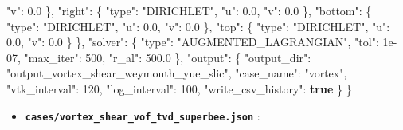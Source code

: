\documentclass[
  10pt,
]{article}
\newenvironment{Shaded}{}{}
\newcommand{\DataTypeTok}[1]{\textcolor[rgb]{0.56,0.13,0.00}{#1}}
\newcommand{\DecValTok}[1]{\textcolor[rgb]{0.25,0.63,0.44}{#1}}
\newcommand{\FloatTok}[1]{\textcolor[rgb]{0.25,0.63,0.44}{#1}}
\newcommand{\FunctionTok}[1]{\textcolor[rgb]{0.02,0.16,0.49}{#1}}
\newcommand{\KeywordTok}[1]{\textcolor[rgb]{0.00,0.44,0.13}{\textbf{#1}}}
\newcommand{\StringTok}[1]{\textcolor[rgb]{0.25,0.44,0.63}{#1}}
\providecommand{\tightlist}{%
  \setlength{\itemsep}{0pt}\setlength{\parskip}{0pt}}
\begin{document}
\begin{Shaded}
\begin{Highlighting}[]
      \DataTypeTok{"v"}\FunctionTok{:} \FloatTok{0.0}
    \FunctionTok{\},}
    \DataTypeTok{"right"}\FunctionTok{:} \FunctionTok{\{}
      \DataTypeTok{"type"}\FunctionTok{:} \StringTok{"DIRICHLET"}\FunctionTok{,}
      \DataTypeTok{"u"}\FunctionTok{:} \FloatTok{0.0}\FunctionTok{,}
      \DataTypeTok{"v"}\FunctionTok{:} \FloatTok{0.0}
    \FunctionTok{\},}
    \DataTypeTok{"bottom"}\FunctionTok{:} \FunctionTok{\{}
      \DataTypeTok{"type"}\FunctionTok{:} \StringTok{"DIRICHLET"}\FunctionTok{,}
      \DataTypeTok{"u"}\FunctionTok{:} \FloatTok{0.0}\FunctionTok{,}
      \DataTypeTok{"v"}\FunctionTok{:} \FloatTok{0.0}
    \FunctionTok{\},}
    \DataTypeTok{"top"}\FunctionTok{:} \FunctionTok{\{}
      \DataTypeTok{"type"}\FunctionTok{:} \StringTok{"DIRICHLET"}\FunctionTok{,}
      \DataTypeTok{"u"}\FunctionTok{:} \FloatTok{0.0}\FunctionTok{,}
      \DataTypeTok{"v"}\FunctionTok{:} \FloatTok{0.0}
    \FunctionTok{\}}
  \FunctionTok{\},}
  \DataTypeTok{"solver"}\FunctionTok{:} \FunctionTok{\{}
    \DataTypeTok{"type"}\FunctionTok{:} \StringTok{"AUGMENTED\_LAGRANGIAN"}\FunctionTok{,}
    \DataTypeTok{"tol"}\FunctionTok{:} \DecValTok{1e{-}07}\FunctionTok{,}
    \DataTypeTok{"max\_iter"}\FunctionTok{:} \DecValTok{500}\FunctionTok{,}
    \DataTypeTok{"r\_al"}\FunctionTok{:} \FloatTok{500.0}
  \FunctionTok{\},}
  \DataTypeTok{"output"}\FunctionTok{:} \FunctionTok{\{}
    \DataTypeTok{"output\_dir"}\FunctionTok{:} \StringTok{"output\_vortex\_shear\_weymouth\_yue\_slic"}\FunctionTok{,}
    \DataTypeTok{"case\_name"}\FunctionTok{:} \StringTok{"vortex"}\FunctionTok{,}
    \DataTypeTok{"vtk\_interval"}\FunctionTok{:} \DecValTok{120}\FunctionTok{,}
    \DataTypeTok{"log\_interval"}\FunctionTok{:} \DecValTok{100}\FunctionTok{,}
    \DataTypeTok{"write\_csv\_history"}\FunctionTok{:} \KeywordTok{true}
  \FunctionTok{\}}
\FunctionTok{\}}
\end{Highlighting}
\end{Shaded}

\begin{itemize}
\tightlist
\item
  \textbf{\texttt{cases/vortex\_shear\_vof\_tvd\_superbee.json}} :
\end{itemize}
\end{document}
